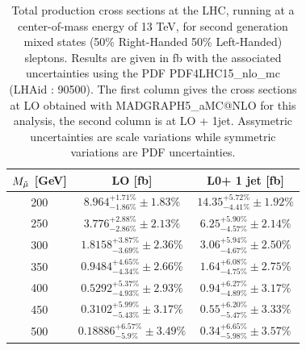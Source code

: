 \documentclass{cernatlasnote}
\begin{document}
\begin{table}
    \centering
    \begin{tabular}{ | c | c | c |}
        \hline
        \rowcolor{lightgray} 
         $M_{\Tilde{\mu}}$ [GeV] &  LO [fb] & L0+ 1 jet [fb]\\
         \hline
         200  & $8.964^{+1.71\%}_{-1.86\%} \pm 1.83\%$ & $14.35^{+5.72\%}_{-4.41\%} \pm 1.92\%$ \\
         \hline
         250   & $3.776^{+2.88\%}_{-2.86\%} \pm 2.13\%$ &  $6.25^{+5.90\%}_{-4.57\%} \pm 2.14\%$\\
         \hline
         300  & $1.8158^{+3.87\%}_{-3.69\%} \pm 2.36\%$ &  $3.06^{+5.94\%}_{-4.67\%} \pm 2.50\%$\\
         \hline
         350 &  $0.9484^{+4.65\%}_{-4.34\%} \pm 2.66\%$ &  $1.64^{+6.08\%}_{-4.75\%} \pm 2.75\%$\\
         \hline
         400  & $0.5292^{+5.37\%}_{-4.93\%} \pm 2.93\%$ & $0.94^{+6.27\%}_{-4.89\%} \pm 3.17\%$\\
         \hline
         450  & $0.3102^{+5.99\%}_{-5.43\%} \pm 3.17\%$ & $0.55^{+6.20\%}_{-5.47\%} \pm 3.33\%$\\
         \hline
         500  & $0.18886^{+6.57\%}_{-5.9\%} \pm 3.49\%$ & $0.34^{+6.65\%}_{-5.98\%} \pm 3.57\%$\\
         \hline
    \end{tabular}
    \caption{Total production cross sections at the LHC, running at a center-of-mass energy of 13 TeV, for second generation mixed states (50\% Right-Handed 50\% Left-Handed) sleptons. Results are given in fb with the associated uncertainties using the PDF PDF4LHC15\_nlo\_mc (LHAid : 90500). The first column gives the cross sections at LO obtained with MADGRAPH5\_aMC@NLO for this analysis, the second column is at LO + 1jet. Assymetric uncertainties are scale variations while symmetric variations are PDF uncertainties.} 
    \label{tab:RLLRXS}
\end{table}
\FloatBarrier
\end{document}
